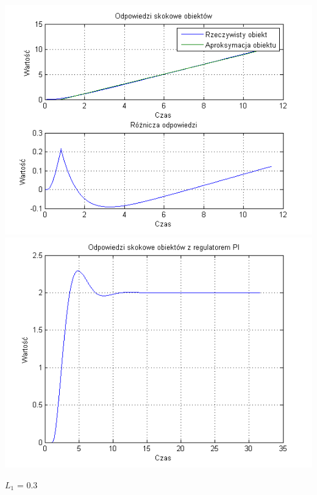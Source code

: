 \documentclass[10pt,a4paper]{article}
\begin{document}
\begin{center}
\includegraphics[scale=1]{images/jeden/skrypt_141.png}\\
\includegraphics[scale=1]{images/jeden/skrypt_142.png}\\
\end{center}
\newpage
$L_1$ = 0.3
\end{document}
